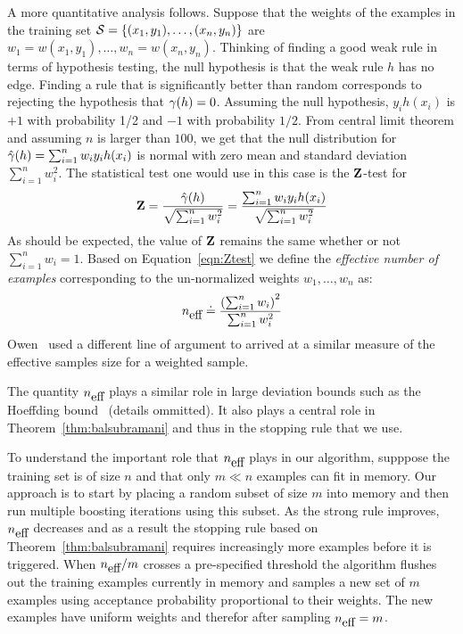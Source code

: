 A more quantitative analysis follows. Suppose that the weights of the
examples in the training set ${\cal S}=\{ (x_1, y_1), \ldots, (x_n,
y_n) \}$ are $w_1=w(x_1,y_1),\ldots,w_n=w(x_n,y_n)$. Thinking of
finding a good weak rule in terms of hypothesis testing, the null
hypothesis is that the weak rule $h$ has no edge. Finding a rule that
is significantly better than random corresponds to rejecting the
hypothesis that $\gamma(h)=0$.  Assuming the null hypothesis, $y_i
h(x_i)$ is $+1$ with probability 1/2 and $-1$ with probability
$1/2$. From central limit theorem and assuming $n$ is larger than
$100$, we get that the null distribution for $\hat{\gamma}(h)=\sum_{i=1}^n
w_i y_i h(x_i)$ is normal with zero mean and standard deviation
$\sum_{i=1}^n w_i^2$. The statistical test one would use in this case
is the ${\mathbf Z}$-test for
\begin{equation} \label{eqn:Ztest}
{\mathbf Z} = \frac{\hat{\gamma}(h)}{\sqrt{\sum_{i=1}^n w_i^2}}
= \frac{\sum_{i=1}^n w_i y_i h(x_i)}{\sqrt{\sum_{i=1}^n w_i^2}}
\end{equation}
As should be expected, the value of ${\mathbf Z}$ remains the same whether
or not $\sum_{i=1}^n w_i=1$. Based on Equation~\ref{eqn:Ztest} we
define the {\em effective number of examples} corresponding to the
un-normalized weights $w_1,\ldots,w_n$ as:
\begin{equation} \label{eqn:neff}
  {n_{\mbox{eff}}} \doteq \frac{\left(\sum_{i=1}^n w_i\right)^2}{\sum_{i=1}^n w_i^2}
\end{equation}
Owen~\cite{owen_monte_2013} used a different line of
argument to arrived at a similar measure of
the effective samples size for a weighted sample.

The quantity ${n_{\mbox{eff}}}$ plays a similar role in large deviation bounds
such as the Hoeffding bound~\cite{hoeffding_probability_1963} (details ommitted).
It also plays
a central role in Theorem~\ref{thm:balsubramani} and thus in the
stopping rule that we use.

To understand the important role that ${n_{\mbox{eff}}}$ plays in our algorithm,
supppose the training set is of size $n$ and that only $m \ll n$
examples can fit in memory. Our approach is to start by placing a
random subset of size $m$ into memory and then run multiple
boosting iterations using this subset. As the strong rule improves,
${n_{\mbox{eff}}}$ decreases and as a result the stopping rule based on
Theorem~\ref{thm:balsubramani} requires increasingly more examples
before it is triggered. When ${n_{\mbox{eff}}}/m$ crosses a pre-specified
threshold the algorithm flushes out the training examples currently in
memory and samples a new set of $m$ examples using acceptance
probability proportional to their weights. The new examples have
uniform weights and therefor after sampling ${n_{\mbox{eff}}}=m$.

